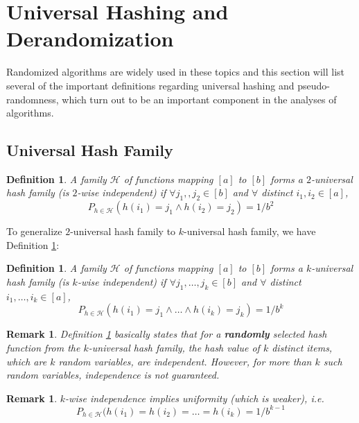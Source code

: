 \documentclass[11pt]{article}
\theoremstyle{plain}
\newtheorem{definition}[theorem]{Definition}
\newtheorem{remark}[theorem]{Remark}
\begin{document}
\section{Universal Hashing and Derandomization}
\label{s:hashprg}

Randomized algorithms are widely used in these topics and this section will 
list several of the important definitions regarding universal hashing and 
pseudo-randomness, which turn out to be an important component in the 
analyses of algorithms. 

\subsection{Universal Hash Family}
\begin{definition} 
\label{def:2wise}
A family $\mathcal{H}$ of functions mapping $[a]$ to 
$[b]$ forms a $2$-universal hash family (is $2$-wise independent) if $\forall 
j_1,, j_2 \in [b]$ and $\forall$ distinct $i_1,i_2 \in [a]$,
	$$P_{h \in \mathcal{H}}(h(i_1) = j_1 \wedge h(i_2) = j_2) = 
	1/b^2$$ 
\end{definition}

To generalize $2$-universal hash family to  $k$-universal hash family, we 
have Definition  \ref{def:kwise}:
\begin{definition} 
\label{def:kwise}
A family $\mathcal{H}$ of functions mapping $[a]$ to 
$[b]$ forms a $k$-universal hash family (is $k$-wise independent) if $\forall 
j_1, \ldots, j_k \in [b]$ and $\forall$ 
distinct $i_1, \ldots, i_k \in [a]$,
	$$P_{h \in \mathcal{H}}(h(i_1) = j_1 \wedge \ldots \wedge h(i_k) = j_k) = 
	1/b^k$$ 
\end{definition}
\begin{remark}
	Definition  \ref{def:kwise} basically states that for a \textbf{randomly} 
	selected hash function from the $k$-universal hash family, the hash value 
	of $k$ distinct items, which are $k$ random variables, are independent. 
	However, for more than $k$ such random variables, independence is not 
	guaranteed.  
\end{remark}
\begin{remark}
	$k$-wise independence implies uniformity (which is weaker), i.e. 
	$$P_{h \in \mathcal{H}}(h(i_1) = h(i_2)=\dots=h(i_k  ) = 1/b^{k-1}$$ 
\end{remark}
\end{document}
